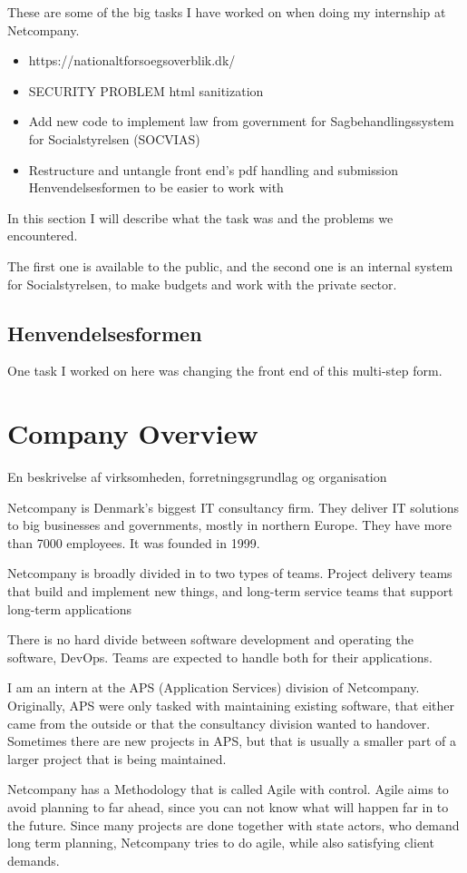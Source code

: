 \documentclass[../main.tex]{subfiles}
\begin{document}

These are some of the big tasks I have worked on when doing my internship at Netcompany.

\begin{itemize}
    \item https://nationaltforsoegsoverblik.dk/ 
    \item SECURITY PROBLEM html sanitization 
    \item Add new code to implement law from government for Sagbehandlingssystem for Socialstyrelsen (SOCVIAS) 
    \item Restructure and untangle front end's pdf handling and submission Henvendelsesformen to be easier to work with
\end{itemize}

In this section I will describe what the task was and the problems we encountered. 


The first one is available to the public, and the second one is an internal system for Socialstyrelsen, to make budgets and work with the private sector. 

\subsection{Henvendelsesformen}
One task I worked on here was changing the front end of this multi-step form. 



\section{Company Overview}
En beskrivelse af virksomheden, forretningsgrundlag og organisation 

Netcompany is Denmark's biggest IT consultancy firm.
They deliver IT solutions to big businesses and governments, mostly in northern Europe.
They have more than 7000 employees. It was founded in 1999. 

Netcompany is broadly divided in to two types of teams.
Project delivery teams that build and implement new things, and long-term service teams that support long-term applications

There is no hard divide between software development and operating the software, DevOps. Teams are expected to handle both for their applications. 

I am an intern at the APS (Application Services) division of Netcompany.
Originally, APS were only tasked with maintaining existing software, that either came from the outside or that the consultancy division wanted to handover.
Sometimes there are new projects in APS, but that is usually a smaller part of a larger project that is being maintained.  

Netcompany has a Methodology that is called Agile with control. Agile aims to avoid planning to far ahead, since you can not know what will happen far in to the future.
Since many projects are done together with state actors, who demand long term planning, Netcompany tries to do agile, while also satisfying client demands. 
\end{document}
